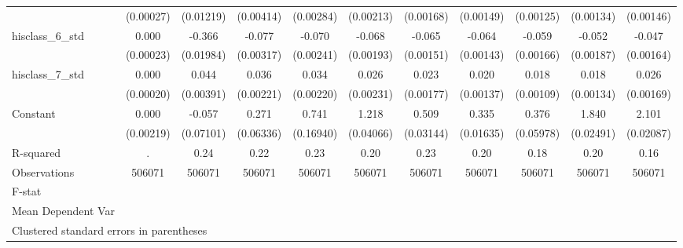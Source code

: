 {\begin{tabular}{l*{10}{c}}
                    &   (0.00027)         &   (0.01219)         &   (0.00414)         &   (0.00284)         &   (0.00213)         &   (0.00168)         &   (0.00149)         &   (0.00125)         &   (0.00134)         &   (0.00146)         \\
hisclass\_6\_std      &       0.000         &      -0.366\sym{***}&      -0.077\sym{***}&      -0.070\sym{***}&      -0.068\sym{***}&      -0.065\sym{***}&      -0.064\sym{***}&      -0.059\sym{***}&      -0.052\sym{***}&      -0.047\sym{***}\\
                    &   (0.00023)         &   (0.01984)         &   (0.00317)         &   (0.00241)         &   (0.00193)         &   (0.00151)         &   (0.00143)         &   (0.00166)         &   (0.00187)         &   (0.00164)         \\
hisclass\_7\_std      &       0.000         &       0.044\sym{***}&       0.036\sym{***}&       0.034\sym{***}&       0.026\sym{***}&       0.023\sym{***}&       0.020\sym{***}&       0.018\sym{***}&       0.018\sym{***}&       0.026\sym{***}\\
                    &   (0.00020)         &   (0.00391)         &   (0.00221)         &   (0.00220)         &   (0.00231)         &   (0.00177)         &   (0.00137)         &   (0.00109)         &   (0.00134)         &   (0.00169)         \\
Constant            &       0.000         &      -0.057         &       0.271\sym{***}&       0.741\sym{***}&       1.218\sym{***}&       0.509\sym{***}&       0.335\sym{***}&       0.376\sym{***}&       1.840\sym{***}&       2.101\sym{***}\\
                    &   (0.00219)         &   (0.07101)         &   (0.06336)         &   (0.16940)         &   (0.04066)         &   (0.03144)         &   (0.01635)         &   (0.05978)         &   (0.02491)         &   (0.02087)         \\
\hline
R-squared           &           .         &        0.24         &        0.22         &        0.23         &        0.20         &        0.23         &        0.20         &        0.18         &        0.20         &        0.16         \\
Observations        &      506071         &      506071         &      506071         &      506071         &      506071         &      506071         &      506071         &      506071         &      506071         &      506071         \\
F-stat              &                     &                     &                     &                     &                     &                     &                     &                     &                     &                     \\
Mean Dependent Var  &                     &                     &                     &                     &                     &                     &                     &                     &                     &                     \\
\hline\hline
\multicolumn{11}{l}{\footnotesize Clustered standard errors in parentheses}\\
\end{tabular}
}
